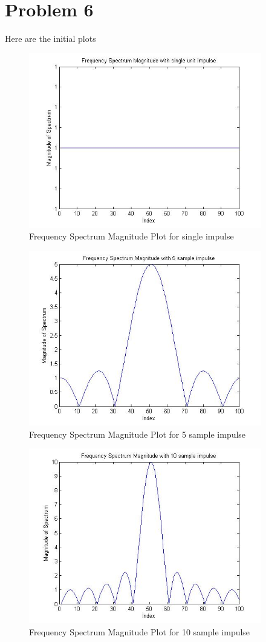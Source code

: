 \documentclass[11pt,psfig]{article}
\begin{document}
\section*{Problem 6}

Here are the initial plots

\begin{figure}[H]
\centering
\includegraphics[height=3in]{prob6plot_freq1.jpg}
\caption{Frequency Spectrum Magnitude Plot for single impulse}
\end{figure}

\begin{figure}[H]
\centering
\includegraphics[height=3in]{prob6plot_freq5.jpg}
\caption{Frequency Spectrum Magnitude Plot for 5 sample impulse}
\end{figure}

\begin{figure}[H]
\centering
\includegraphics[height=3in]{prob6plot_freq10.jpg}
\caption{Frequency Spectrum Magnitude Plot for 10 sample impulse}
\end{figure}
\end{document}
